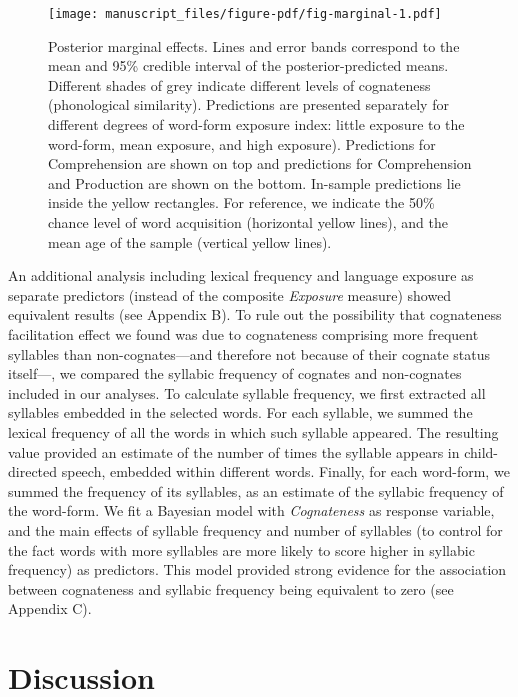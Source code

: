 \documentclass[
]{article}
\begin{document}
\begin{figure}

{\centering \texttt{[image: manuscript\_files/figure-pdf/fig-marginal-1.pdf]}

}

\caption{\label{fig-marginal}Posterior marginal effects. Lines and error
bands correspond to the mean and 95\% credible interval of the
posterior-predicted means. Different shades of grey indicate different
levels of cognateness (phonological similarity). Predictions are
presented separately for different degrees of word-form exposure index:
little exposure to the word-form, mean exposure, and high exposure).
Predictions for Comprehension are shown on top and predictions for
Comprehension and Production are shown on the bottom. In-sample
predictions lie inside the yellow rectangles. For reference, we indicate
the 50\% chance level of word acquisition (horizontal yellow lines), and
the mean age of the sample (vertical yellow lines).}

\end{figure}

An additional analysis including lexical frequency and language exposure
as separate predictors (instead of the composite \emph{Exposure}
measure) showed equivalent results (see Appendix B). To rule out the
possibility that cognateness facilitation effect we found was due to
cognateness comprising more frequent syllables than non-cognates---and
therefore not because of their cognate status itself---, we compared the
syllabic frequency of cognates and non-cognates included in our
analyses. To calculate syllable frequency, we first extracted all
syllables embedded in the selected words. For each syllable, we summed
the lexical frequency of all the words in which such syllable appeared.
The resulting value provided an estimate of the number of times the
syllable appears in child-directed speech, embedded within different
words. Finally, for each word-form, we summed the frequency of its
syllables, as an estimate of the syllabic frequency of the word-form. We
fit a Bayesian model with \emph{Cognateness} as response variable, and
the main effects of syllable frequency and number of syllables (to
control for the fact words with more syllables are more likely to score
higher in syllabic frequency) as predictors. This model provided strong
evidence for the association between cognateness and syllabic frequency
being equivalent to zero (see Appendix C).

\hypertarget{sec-discussion}{%
\section{Discussion}\label{sec-discussion}}
\end{document}
